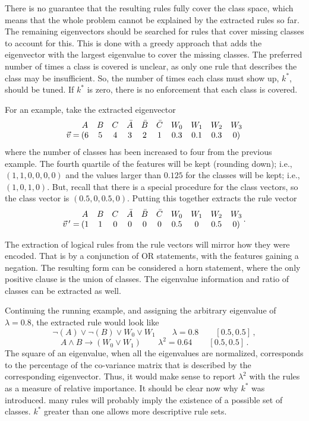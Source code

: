 \documentclass[10pt]{article}
\begin{document}
There is no guarantee that the resulting rules fully cover the class space, which means that the whole problem cannot be explained by the extracted rules so far. The remaining eigenvectors should be searched for rules that cover missing classes to account for this. This is done with a greedy approach that adds the eigenvector with the largest eigenvalue to cover the missing classes. The preferred number of times a class is covered is unclear, as only one rule that describes the class may be insufficient. So, the number of times each class must show up, $k^*$, should be tuned. If $k^*$ is zero, there is no enforcement that each class is covered. 

For an example, take the extracted eigenvector
\[\mqty{\, \\\vec{v} = } \:\mqty{A&B&C&\bar{A}&\bar{B}&\bar{C}&W_0&W_1&W_2&W_3\\(6&5&4&3&2&1&0.3&0.1&0.3&0)}\]
where the number of classes has been increased to four from the previous example. The fourth quartile of the features will be kept (rounding down); i.e., $(1,1,0,0,0,0)$ and the values larger than $0.125$ for the classes will be kept; i.e., $(1, 0, 1, 0)$. But, recall that there is a special procedure for the class vectors, so the class vector is $(0.5, 0, 0.5, 0)$. Putting this together extracts the rule vector 
\[\mqty{\, \\\vec{v}\, ^\prime = } \:\mqty{A&B&C&\bar{A}&\bar{B}&\bar{C}&W_0&W_1&W_2&W_3\\(1&1&0&0&0&0&0.5&0&0.5&0)} \, .\]

The extraction of logical rules from the rule vectors will mirror how they were encoded. That is by a conjunction of OR statements, with the features gaining a negation. The resulting form can be considered a horn statement, where the only positive clause is the union of classes. The eigenvalue information and ratio of classes can be extracted as well. 

Continuing the running example, and assigning the arbitrary eigenvalue of $\lambda =0.8$, the extracted rule would look like
\[\neg(A)\lor \neg(B) \lor W_0 \lor W_1 \qquad \lambda=0.8 \qquad [0.5, 0.5] \, ,\]
\[A \land B \rightarrow (W_0 \lor W_1) \qquad \lambda^2=0.64 \qquad [0.5, 0.5] \, .\]
The square of an eigenvalue, when all the eigenvalues are normalized, corresponds to the percentage of the co-variance matrix that is described by the corresponding eigenvector. Thus, it would make sense to report $\lambda^2$ with the rules as a measure of relative importance. It should be clear now why $k^*$ was introduced. many rules will probably imply the existence of a possible set of classes. $k^*$ greater than one allows more descriptive rule sets.
\end{document}

